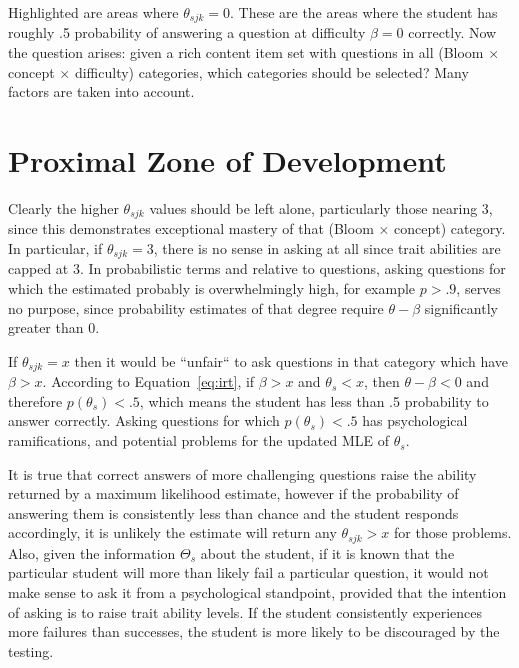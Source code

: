 Highlighted are areas where $\theta_{sjk} = 0$. These are the areas where the
student has roughly .5 probability of answering a question at difficulty
$\beta=0$ correctly.  Now the question arises: given a rich content item set
with questions in all (Bloom $\times$ concept $\times$ difficulty) categories,
which categories should be selected?  Many factors are taken into account.

\section{Proximal Zone of Development}

Clearly the higher $\theta_{sjk}$ values should be left alone, particularly
those nearing 3, since this demonstrates exceptional mastery of that (Bloom
$\times$ concept) category.  In particular, if $\theta_{sjk} = 3$, there is no
sense in asking at all since trait abilities are capped at 3.  In probabilistic
terms and relative to questions, asking questions for which the estimated
probably is overwhelmingly high, for example $p > .9$, serves no purpose, since
probability estimates of that degree require $\theta-\beta$ significantly
greater than 0.

If $\theta_{sjk} = x$ then it would be ``unfair`` to ask questions in that
category which have $\beta > x$.  According to Equation~\ref{eq:irt}, if $\beta
> x$ and $\theta_s < x$, then $\theta-\beta < 0$ and therefore $p(\theta_s) <
.5$, which means the student has less than .5 probability to answer correctly.
Asking questions for which $p(\theta_s) < .5$ has psychological ramifications,
and potential problems for the updated MLE of $\theta_s$.

It is true that correct answers of more challenging questions raise the ability
returned by a maximum likelihood estimate, however if the probability of
answering them is consistently less than chance and the student responds
accordingly, it is unlikely the estimate will return any $\theta_{sjk} > x$ for
those problems.  Also, given the information $\Theta_s$ about the student, if
it is known that the particular student will more than likely fail a particular
question, it would not make sense to ask it from a psychological standpoint,
provided that the intention of asking is to raise trait ability levels.  If the
student consistently experiences more failures than successes, the student is
more likely to be discouraged by the testing. 

